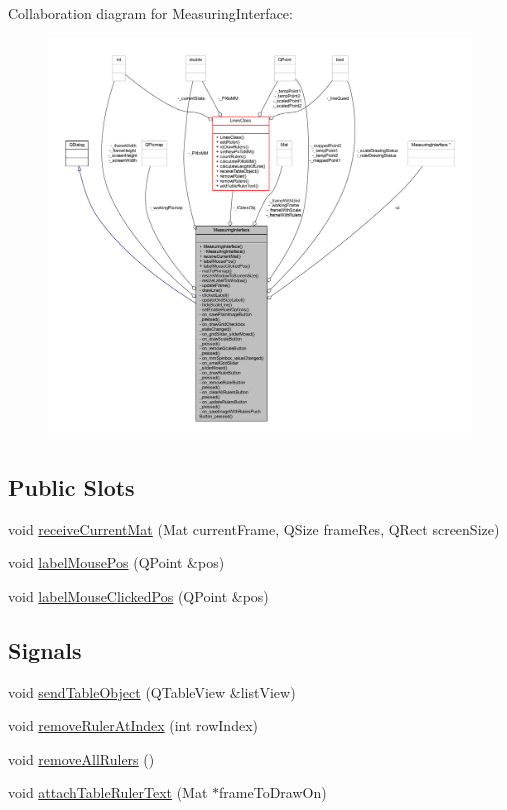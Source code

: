 Collaboration diagram for Measuring\+Interface\+:
\nopagebreak
\begin{figure}[H]
\begin{center}
\leavevmode
\includegraphics[width=350pt]{class_measuring_interface__coll__graph}
\end{center}
\end{figure}
\subsection*{Public Slots}
\begin{DoxyCompactItemize}
\item 
void \mbox{\hyperlink{class_measuring_interface_a776a6aa345a738ee46e84c272fd35ce7}{receive\+Current\+Mat}} (Mat current\+Frame, Q\+Size frame\+Res, Q\+Rect screen\+Size)
\item 
void \mbox{\hyperlink{class_measuring_interface_a3e7eef22037ecb47ad2349205684c6ea}{label\+Mouse\+Pos}} (Q\+Point \&pos)
\item 
void \mbox{\hyperlink{class_measuring_interface_a02eaf8106ec4eb62d0057c6d447f94c5}{label\+Mouse\+Clicked\+Pos}} (Q\+Point \&pos)
\end{DoxyCompactItemize}
\subsection*{Signals}
\begin{DoxyCompactItemize}
\item 
void \mbox{\hyperlink{class_measuring_interface_a1c458529cab62e1c2aa540107aa5285a}{send\+Table\+Object}} (Q\+Table\+View \&list\+View)
\item 
void \mbox{\hyperlink{class_measuring_interface_afe9e0efd285c9239d38d2fa9b9d8ff43}{remove\+Ruler\+At\+Index}} (int row\+Index)
\item 
void \mbox{\hyperlink{class_measuring_interface_afc88c0d8a1a77e188aa000e2efb1cc80}{remove\+All\+Rulers}} ()
\item 
void \mbox{\hyperlink{class_measuring_interface_a7a0020d816d48433a2f5035d72b47c68}{attach\+Table\+Ruler\+Text}} (Mat $\ast$frame\+To\+Draw\+On)
\end{DoxyCompactItemize}
